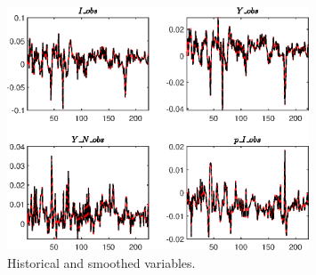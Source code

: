  
\begin{figure}[H]
\centering 
\includegraphics[width=0.80\textwidth]{BRS_growth_KPR/graphs/BRS_growth_KPR_HistoricalAndSmoothedVariables1}
\caption{Historical and smoothed variables.}\label{Fig:HistoricalAndSmoothedVariables:1}
\end{figure}


